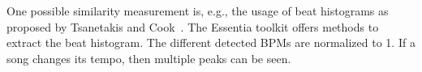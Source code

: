 One possible similarity measurement is, e.g., the usage of beat histograms as proposed by Tsanetakis and Cook~\cite{rhythm3}. The Essentia toolkit offers methods to extract the beat histogram. The different detected BPMs are normalized to 1. If a song changes its tempo, then multiple peaks can be seen.
\begin{figure}[htbp]
	\centering
\end{figure}
